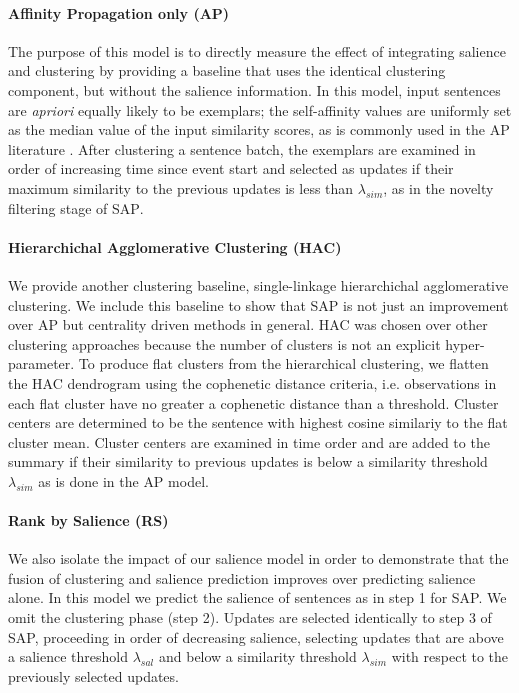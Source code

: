 \paragraph{Affinity Propagation only (\textsc{AP})} The purpose of this model 
is to 
directly measure the effect of integrating salience and clustering by 
providing a baseline that uses the identical clustering component, but without
the salience information. In this model, input sentences are \textit{apriori}
equally likely to be exemplars; the self-affinity values are uniformly set as the 
median value of the  input similarity scores, as is commonly used in the 
\textsc{AP} 
literature \citep{frey2007clustering}. After clustering a sentence batch, the 
exemplars are examined in order of increasing time since event start and 
selected as updates if their maximum similarity to the previous updates is 
less than $\lambda_{sim}$, as in the novelty filtering stage of 
\textsc{SAP}.


\paragraph{Hierarchichal Agglomerative Clustering (HAC)} We provide another
clustering baseline, single-linkage hierarchichal agglomerative clustering.
We include this baseline to show that SAP is not just an improvement over
\textsc{AP} but centrality driven methods in general. \textsc{HAC} was chosen
over other clustering approaches because the number of clusters is not an
explicit hyper-parameter. To produce flat clusters from the hierarchical
clustering, we flatten the \textsc{HAC} dendrogram using the cophenetic
distance criteria, i.e.  observations in each flat cluster have no greater a
cophenetic distance than a threshold. Cluster centers are determined to be the
sentence with highest cosine similariy to the flat cluster mean. Cluster
centers are examined in time order and are added to the summary if their
similarity to previous updates is below a similarity threshold $\lambda_{sim}$
as is done in the \textsc{AP} model.


\paragraph{Rank by Salience (RS)} 
We also isolate the impact of our salience model in order to demonstrate 
that the fusion of clustering and salience prediction improves over
predicting salience alone. In this model we predict the salience of sentences 
as in step 1 for SAP. We omit the clustering phase (step 2).
Updates are selected identically to step 3 of SAP, 
proceeding in order
of decreasing salience, selecting updates that are above a salience 
threshold $\lambda_{sal}$ and below a similarity threshold $\lambda_{sim}$
with respect to the previously selected updates.
